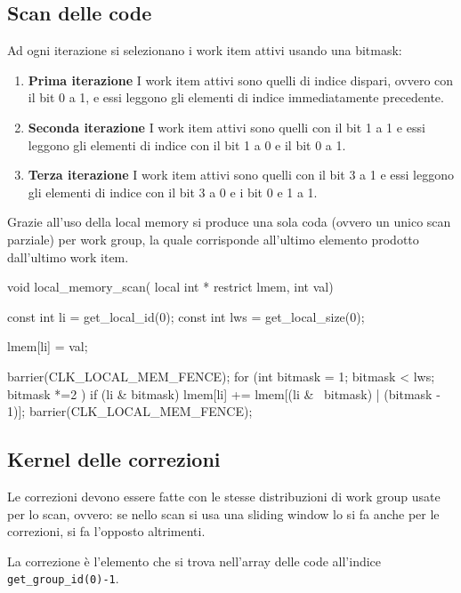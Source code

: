 \subsection{Scan delle code}
Ad ogni iterazione si selezionano i work item attivi usando una bitmask:

\begin{enumerate}
    \item \textbf{Prima iterazione} I work item attivi sono quelli di indice dispari, ovvero con il bit 0 a 1, e essi leggono gli elementi di indice immediatamente precedente.
    \item \textbf{Seconda iterazione} I work item attivi sono quelli con il bit 1 a 1 e essi leggono gli elementi di indice con il bit 1 a 0 e il bit 0 a 1.
    \item \textbf{Terza iterazione} I work item attivi sono quelli con il bit 3 a 1 e essi leggono gli elementi di indice con il bit 3 a 0 e i bit 0 e 1 a 1.
\end{enumerate}

Grazie all'uso della local memory si produce una sola coda (ovvero un unico scan parziale) per work group, la quale corrisponde all'ultimo elemento prodotto dall'ultimo work item.

\begin{code}[caption={Scansione delle code}, label={code:scan_code}]
void local_memory_scan(
	local        int  * restrict lmem,
	int val)
{
	const int li = get_local_id(0);
	const int lws = get_local_size(0);

	lmem[li] = val;

	barrier(CLK_LOCAL_MEM_FENCE);
	for (int bitmask = 1; bitmask < lws; bitmask *=2 ) {
		if (li & bitmask)
			lmem[li] += lmem[(li & ~bitmask) | (bitmask - 1)];
		barrier(CLK_LOCAL_MEM_FENCE);
	}
}
\end{code}


\subsection{Kernel delle correzioni}
Le correzioni devono essere fatte con le stesse distribuzioni di work group usate per lo scan, ovvero: se nello scan si usa una sliding window lo si fa anche per le correzioni, si fa l'opposto altrimenti.

La correzione è l'elemento che si trova nell'array delle code all'indice \texttt{get\_group\_id(0)-1}. 

